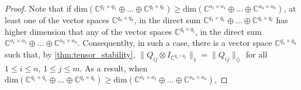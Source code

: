 \begin{proof}
Note that if  $\text{dim}(\mathbb{C}^{q_1 \times q_1} \oplus \ldots \oplus \mathbb{C}^{q_t \times q_t}) \geq  \text{dim}(\mathbb{C}^{o_1 \times o_1} \oplus \ldots \oplus \mathbb{C}^{o_n \times o_n})$, at least one of the vector spaces ${\mathbb{C}^{q_k \times q_k}}$, in the direct sum $\mathbb{C}^{q_1 \times q_1} \oplus \ldots \oplus \mathbb{C}^{q_t \times q_t}$ has higher dimension that any of the vector spaces ${\mathbb{C}^{q_l \times q_l}}$, in the direct sum $\mathbb{C}^{o_1 \times o_1} \oplus \ldots \oplus \mathbb{C}^{o_n \times o_n}$. Consequentlty, in such a case, there is a vector space $\mathbb{C}^{q_k \times q_k}$ such that, by \autoref{thm:tensor_stability},  $ \lVert Q_{ij} \otimes I_{\mathbb{C}^{q_k \times q_k}} \rVert_1 = {\|Q_{ij}\|_{\diamondsuit}}$ for all $1\leq i \leq n$, $1 \leq j \leq m$. As a result, when $\text{dim}(\mathbb{C}^{q_1 \times q_1} \oplus \ldots \oplus \mathbb{C}^{q_t \times q_t}) \geq  \text{dim}(\mathbb{C}^{o_1 \times o_1} \oplus \ldots \oplus \mathbb{C}^{o_n \times o_n})$,


\end{proof}
